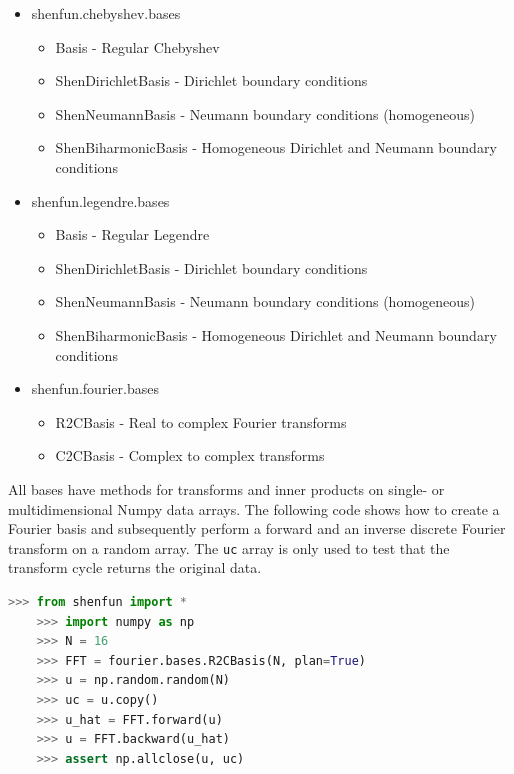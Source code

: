 \documentclass[%
oneside,                 %
final,                   %
10pt]{article}
\theoremstyle{definition}
\begin{document}
\begin{itemize}
  \item shenfun.chebyshev.bases
\begin{itemize}

    \item Basis - Regular Chebyshev 

    \item ShenDirichletBasis - Dirichlet boundary conditions

    \item ShenNeumannBasis - Neumann boundary conditions (homogeneous)

    \item ShenBiharmonicBasis - Homogeneous Dirichlet and Neumann boundary conditions

\end{itemize}

\noindent
  \item shenfun.legendre.bases
\begin{itemize}

    \item Basis - Regular Legendre

    \item ShenDirichletBasis - Dirichlet boundary conditions

    \item ShenNeumannBasis - Neumann boundary conditions (homogeneous)

    \item ShenBiharmonicBasis - Homogeneous Dirichlet and Neumann boundary conditions

\end{itemize}

\noindent
  \item shenfun.fourier.bases
\begin{itemize}

    \item R2CBasis - Real to complex Fourier transforms

    \item C2CBasis - Complex to complex transforms
\end{itemize}

\noindent
\end{itemize}

\noindent
All bases have methods for transforms and inner products on single- or multidimensional Numpy data arrays. The following code shows how to create a Fourier basis and subsequently perform a forward and an inverse discrete Fourier transform on a random array. The \texttt{uc} array is only used to test that the transform cycle returns the original data.
\begin{lstlisting}[language=Python,style=yellow2_fb]
    >>> from shenfun import *
    >>> import numpy as np
    >>> N = 16
    >>> FFT = fourier.bases.R2CBasis(N, plan=True) 
    >>> u = np.random.random(N)
    >>> uc = u.copy()
    >>> u_hat = FFT.forward(u)
    >>> u = FFT.backward(u_hat) 
    >>> assert np.allclose(u, uc)
\end{lstlisting}
\end{document}
